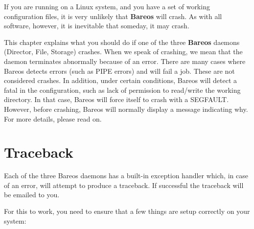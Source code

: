 
\label{debug}

If you are running on a Linux system, and you have a set of working
configuration files, it is very unlikely that {\bf Bareos} will crash. As with
all software, however, it is inevitable that someday, it may crash.

This chapter explains what you should do if one of the three {\bf Bareos}
daemons (Director, File, Storage) crashes.  When we speak of crashing, we
mean that the daemon terminates abnormally because of an error.  There are
many cases where Bareos detects errors (such as PIPE errors) and will fail
a job. These are not considered crashes.  In addition, under certain
conditions, Bareos will detect a fatal in the configuration, such as
lack of permission to read/write the working directory. In that case,
Bareos will force itself to crash with a SEGFAULT. However, before
crashing, Bareos will normally display a message indicating why.
For more details, please read on.

\section{Traceback}

Each of the three Bareos daemons has a built-in exception handler which, in
case of an error, will attempt to produce a traceback. If successful the
traceback will be emailed to you.

For this to work, you need to ensure that a few things are setup correctly on
your system:

